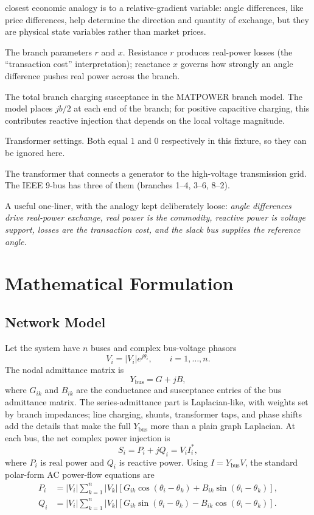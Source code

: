 \documentclass[11pt]{article}
\begin{document}
\begin{description}
  closest economic analogy is to a relative-gradient variable: angle
  differences, like price differences, help determine the direction and
  quantity of exchange, but they are physical state variables rather than
  market prices.
  \item[Series impedance.] The branch parameters $r$ and $x$. Resistance
  $r$ produces real-power losses (the ``transaction cost''
  interpretation); reactance $x$ governs how strongly an angle
  difference pushes real power across the branch.
  \item[Shunt charging ($b$).] The total branch charging susceptance in
  the MATPOWER branch model. The model places $jb/2$ at each end of the
  branch; for positive capacitive charging, this contributes reactive
  injection that depends on the local voltage magnitude.
  \item[Tap ratio, phase shift.] Transformer settings. Both equal $1$
  and $0$ respectively in this fixture, so they can be ignored here.
  \item[Generator step-up transformer (GSU).] The transformer that
  connects a generator to the high-voltage transmission grid. The IEEE
  9-bus has three of them (branches 1--4, 3--6, 8--2).
\end{description}

A useful one-liner, with the analogy kept deliberately loose:
\emph{angle differences drive real-power exchange, real power is the
commodity, reactive power is voltage support, losses are the transaction
cost, and the slack bus supplies the reference angle.}

\section{Mathematical Formulation}

\subsection{Network Model}

Let the system have $n$ buses and complex bus-voltage phasors
\[
  V_i = |V_i| e^{j\theta_i}, \qquad i = 1,\ldots,n.
\]
The nodal admittance matrix is
\[
  Y_{\mathrm{bus}} = G + jB,
\]
where $G_{ik}$ and $B_{ik}$ are the conductance and susceptance entries
of the bus admittance matrix. The series-admittance part is
Laplacian-like, with weights set by branch impedances; line charging,
shunts, transformer taps, and phase shifts add the details that make the
full $Y_{\mathrm{bus}}$ more than a plain graph Laplacian. At each bus,
the net complex power injection is
\[
  S_i = P_i + jQ_i = V_i I_i^*,
\]
where $P_i$ is real power and $Q_i$ is reactive power. Using
$I = Y_{\mathrm{bus}}V$, the standard polar-form AC power-flow equations
are
\begin{align}
  P_i &=
  |V_i| \sum_{k=1}^n |V_k|
  \left[
    G_{ik}\cos(\theta_i-\theta_k)
    + B_{ik}\sin(\theta_i-\theta_k)
  \right], \\
  Q_i &=
  |V_i| \sum_{k=1}^n |V_k|
  \left[
    G_{ik}\sin(\theta_i-\theta_k)
    - B_{ik}\cos(\theta_i-\theta_k)
  \right].
\end{align}
\end{document}
